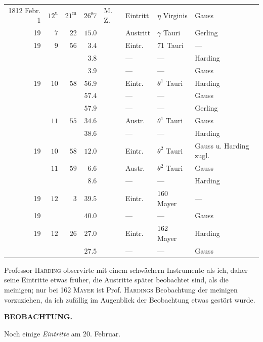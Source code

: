 \begin{center}\fontsize{9}{11}\selectfont\setlength{\tabcolsep}{1.8pt}\renewcommand{\arraystretch}{1.15}\begin{tabular}{rrrrllll}
1812 Febr. 1 & $12^{\mathrm u}$ & $21^{\mathrm m}$ & $26^{\mathrm s}7$ & M.\,Z. & Eintritt & $\eta$ Virginis & Gauss\\
19 & $7$ & $22$ & $15.0$ &  & Austritt & $\gamma$ Tauri & Gerling\\
19 & $9$ & $56$ & $3.4$ &  & Eintr. & 71 Tauri & —\\
 &  &  & $3.8$ &  & — & — & Harding\\
 &  &  & $3.9$ &  & — & — & Gauss\\
19 & $10$ & $58$ & $56.9$ &  & Eintr. & $\theta^1$ Tauri & Harding\\
 &  &  & $57.4$ &  & — & — & Gauss\\
 &  &  & $57.9$ &  & — & — & Gerling\\
 & $11$ & $55$ & $34.6$ &  & Austr. & $\theta^1$ Tauri & Gauss\\
 &  &  & $38.6$ &  & — & — & Harding\\
19 & $10$ & $58$ & $12.0$ &  & Eintr. & $\theta^2$ Tauri & Gauss u. Harding zugl.\\
 & $11$ & $59$ & $6.6$ &  & Austr. & $\theta^2$ Tauri & Gauss\\
 &  &  & $8.6$ &  & — & — & Harding\\
19 & $12$ & $3$ & $39.5$ &  & Eintr. & 160 Mayer & —\\
19 &  &  & $40.0$ &  & — & — & Gauss\\
19 & $12$ & $26$ & $27.0$ &  & Eintr. & 162 Mayer & Harding\\
 &  &  & $27.5$ &  & — & — & Gauss\\
\end{tabular}\end{center}

\par\indent Professor \textsc{Harding} observirte mit einem schwächern Instrumente als ich, daher seine Eintritte etwas früher, die Austritte später beobachtet sind, als die meinigen; nur bei 162 \textsc{Mayer} ist Prof. \textsc{Hardings} Beobachtung der meinigen vorzuziehen, da ich zufällig im Augenblick der Beobachtung etwas gestört wurde.
\clearpage
\thispagestyle{empty}
\noindent{}%
%
\parbox[t]{\dimexpr\linewidth-24mm\relax}{\centering\footnotesize\bfseries BEOBACHTUNG.\par}%
\makebox[12mm][r]{}\par\nobreak\medskip
{}\par\indent Noch einige \emph{Eintritte} am 20. Februar.

